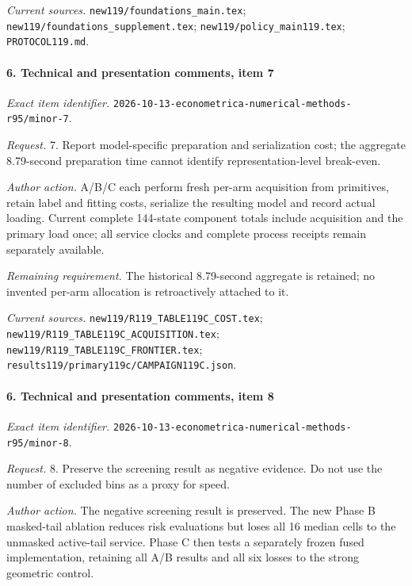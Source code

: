 \par\emph{Current sources.} \nolinkurl{new119/foundations_main.tex}; \nolinkurl{new119/foundations_supplement.tex}; \nolinkurl{new119/policy_main119.tex}; \nolinkurl{PROTOCOL119.md}.

\paragraph{6. Technical and presentation comments, item 7}

\emph{Exact item identifier.} \nolinkurl{2026-10-13-econometrica-numerical-methods-r95/minor-7}.

\par\emph{Request.} 7. Report model-specific preparation and serialization cost; the aggregate 8.79-second preparation time cannot identify representation-level break-even.

\par\emph{Author action.} A/\allowbreak{}B/\allowbreak{}C each perform fresh per-arm acquisition from primitives, retain label and fitting costs, serialize the resulting model and record actual loading. Current complete 144-state component totals include acquisition and the primary load once; all service clocks and complete process receipts remain separately available.

\par\emph{Remaining requirement.} The historical 8.79-second aggregate is retained; no invented per-arm allocation is retroactively attached to it.

\par\emph{Current sources.} \nolinkurl{new119/R119_TABLE119C_COST.tex}; \nolinkurl{new119/R119_TABLE119C_ACQUISITION.tex}; \nolinkurl{new119/R119_TABLE119C_FRONTIER.tex}; \nolinkurl{results119/primary119c/CAMPAIGN119C.json}.

\paragraph{6. Technical and presentation comments, item 8}

\emph{Exact item identifier.} \nolinkurl{2026-10-13-econometrica-numerical-methods-r95/minor-8}.

\par\emph{Request.} 8. Preserve the screening result as negative evidence. Do not use the number of excluded bins as a proxy for speed.

\par\emph{Author action.} The negative screening result is preserved. The new Phase B masked-tail ablation reduces risk evaluations but loses all 16 median cells to the unmasked active-tail service. Phase C then tests a separately frozen fused implementation, retaining all A/\allowbreak{}B results and all six losses to the strong geometric control.

